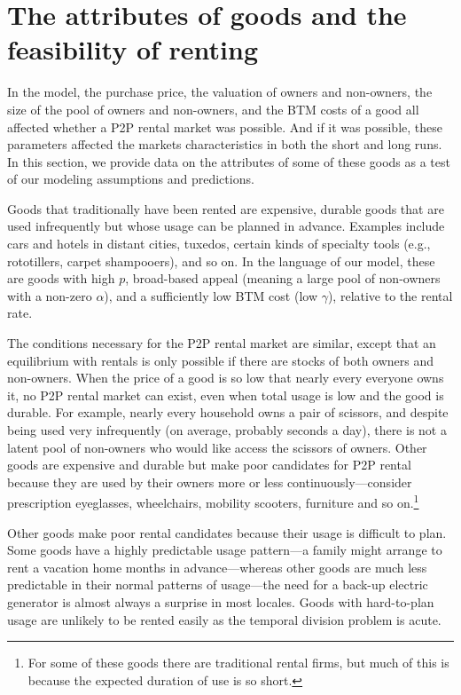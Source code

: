 \documentclass[12pt]{article}
\begin{document}
\section{The attributes of goods and the feasibility of renting} \label{sec:empirics} 

In the model, the purchase price, the valuation of owners and non-owners, the size of the pool of owners and non-owners, and the BTM costs of a good all affected whether a P2P rental market was possible.
And if it was possible, these parameters affected the markets
characteristics in both the short and long runs. 
In this section, we provide data on the attributes of some of these goods as a test of our modeling assumptions and predictions.  

Goods that traditionally have been rented are expensive, durable goods that are used infrequently but whose usage can be planned in advance.
Examples include cars and hotels in distant cities, tuxedos, certain kinds of specialty tools (e.g., rototillers, carpet shampooers), and so on.
In the language of our model, these are goods with high $p$, broad-based appeal (meaning a large pool of non-owners with a non-zero $\alpha$), and a sufficiently low BTM cost (low $\gamma$), relative to the rental rate. 

The conditions necessary for the P2P rental market are similar, except that an equilibrium with rentals is only possible if there are stocks of both owners and non-owners. 
When the price of a good is so low that nearly every everyone owns it, no P2P rental market can exist, even when total usage is low and the good is durable.
For example, nearly every household owns a pair of scissors, and despite being used very infrequently (on average, probably seconds a day), there is not a latent pool of non-owners who would like access the scissors of owners.  
Other goods are expensive and durable but make poor candidates for P2P rental because they are used by their owners more or less continuously---consider prescription eyeglasses, wheelchairs, mobility scooters, furniture and so on.\footnote{
  For some of these goods there are traditional rental firms, but much of this is because the expected duration of use is so short.  
} 

Other goods make poor rental candidates because their usage is difficult to plan. 
Some goods have a highly predictable usage pattern---a family might arrange to rent a vacation home months in advance---whereas other goods are much less predictable in their normal patterns of usage---the need for a back-up electric generator is almost always a surprise in most locales.  
Goods with hard-to-plan usage are unlikely to be rented easily as the temporal division problem is acute.
\end{document}
